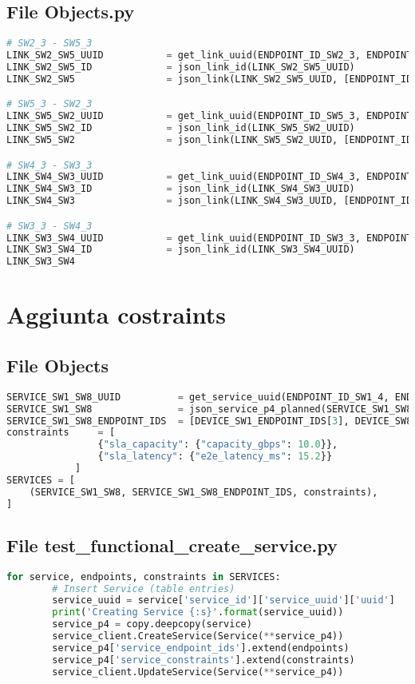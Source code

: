 \subsection{File Objects.py}
\begin{lstlisting}[language=Python]
# SW2_3 - SW5_3
LINK_SW2_SW5_UUID           = get_link_uuid(ENDPOINT_ID_SW2_3, ENDPOINT_ID_SW5_3)
LINK_SW2_SW5_ID             = json_link_id(LINK_SW2_SW5_UUID)
LINK_SW2_SW5                = json_link(LINK_SW2_SW5_UUID, [ENDPOINT_ID_SW2_3, ENDPOINT_ID_SW5_3])

# SW5_3 - SW2_3
LINK_SW5_SW2_UUID           = get_link_uuid(ENDPOINT_ID_SW5_3, ENDPOINT_ID_SW2_3)
LINK_SW5_SW2_ID             = json_link_id(LINK_SW5_SW2_UUID)
LINK_SW5_SW2                = json_link(LINK_SW5_SW2_UUID, [ENDPOINT_ID_SW5_3, ENDPOINT_ID_SW2_3])

# SW4_3 - SW3_3
LINK_SW4_SW3_UUID           = get_link_uuid(ENDPOINT_ID_SW4_3, ENDPOINT_ID_SW3_3)
LINK_SW4_SW3_ID             = json_link_id(LINK_SW4_SW3_UUID)
LINK_SW4_SW3                = json_link(LINK_SW4_SW3_UUID, [ENDPOINT_ID_SW4_3, ENDPOINT_ID_SW3_3])

# SW3_3 - SW4_3
LINK_SW3_SW4_UUID           = get_link_uuid(ENDPOINT_ID_SW3_3, ENDPOINT_ID_SW4_3)
LINK_SW3_SW4_ID             = json_link_id(LINK_SW3_SW4_UUID)
LINK_SW3_SW4 
\end{lstlisting}

\section{Aggiunta costraints}
\label{cap:obj}
\subsection{File Objects}
\begin{lstlisting}[language=Python]
SERVICE_SW1_SW8_UUID          = get_service_uuid(ENDPOINT_ID_SW1_4, ENDPOINT_ID_SW8_4)
SERVICE_SW1_SW8               = json_service_p4_planned(SERVICE_SW1_SW8_UUID)
SERVICE_SW1_SW8_ENDPOINT_IDS  = [DEVICE_SW1_ENDPOINT_IDS[3], DEVICE_SW8_ENDPOINT_IDS[3]]
constraints     = [
                {"sla_capacity": {"capacity_gbps": 10.0}},
                {"sla_latency": {"e2e_latency_ms": 15.2}}
            ]
SERVICES = [
    (SERVICE_SW1_SW8, SERVICE_SW1_SW8_ENDPOINT_IDS, constraints),
]
\end{lstlisting}
\subsection{File test\_functional\_create\_service.py}
\begin{lstlisting}[language=Python]
    for service, endpoints, constraints in SERVICES:
        # Insert Service (table entries)
        service_uuid = service['service_id']['service_uuid']['uuid']
        print('Creating Service {:s}'.format(service_uuid))
        service_p4 = copy.deepcopy(service)
        service_client.CreateService(Service(**service_p4))
        service_p4['service_endpoint_ids'].extend(endpoints)
        service_p4['service_constraints'].extend(constraints)
        service_client.UpdateService(Service(**service_p4))
\end{lstlisting}
